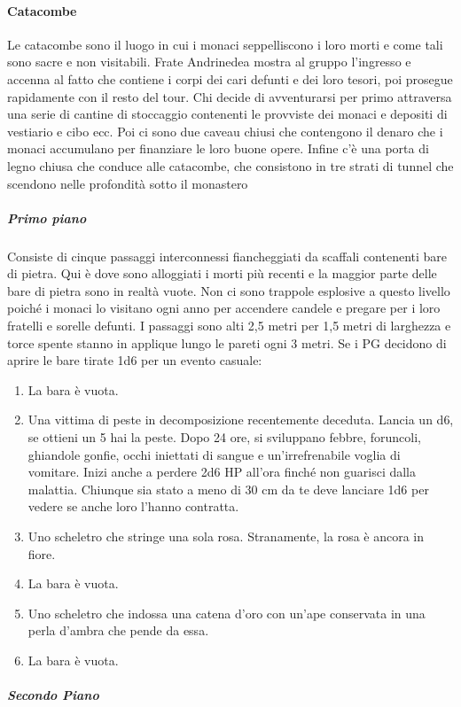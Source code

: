 \documentclass{article}
\begin{document}
    \paragraph{Catacombe}
    Le catacombe sono il luogo in cui i monaci seppelliscono i loro morti e come tali sono sacre e non visitabili. Frate Andrinedea mostra al gruppo l'ingresso e accenna al fatto che contiene i corpi dei cari defunti e dei loro tesori, poi prosegue rapidamente con il resto del tour.
Chi decide di avventurarsi per primo attraversa una serie di cantine di stoccaggio contenenti le provviste dei monaci e depositi di vestiario e cibo ecc.
Poi ci sono due caveau chiusi che contengono il denaro che i monaci accumulano per finanziare le loro buone opere.
Infine c'è una porta di legno chiusa che conduce alle catacombe, che consistono in tre strati di tunnel che scendono nelle profondità sotto il monastero
    \subparagraph{Primo piano}
    Consiste di cinque passaggi interconnessi fiancheggiati da scaffali contenenti bare di pietra. Qui è dove sono alloggiati i morti più recenti e la maggior parte delle bare di pietra sono in realtà vuote. Non ci sono trappole esplosive a questo livello poiché i monaci lo visitano ogni anno per accendere candele e pregare per i loro fratelli e sorelle defunti. I passaggi sono alti 2,5 metri per 1,5 metri di larghezza e torce spente stanno in applique lungo le pareti ogni 3 metri.
    Se i PG decidono di aprire le bare tirate 1d6 per un evento casuale:
    \begin{enumerate}
        \item La bara è vuota.
        \item Una vittima di peste in decomposizione recentemente deceduta. Lancia un d6, se ottieni un 5 hai la peste. Dopo 24 ore, si sviluppano febbre, foruncoli, ghiandole gonfie, occhi iniettati di sangue e un'irrefrenabile voglia di vomitare. Inizi anche a perdere 2d6 HP all'ora finché non guarisci dalla malattia. Chiunque sia stato a meno di 30 cm da te deve lanciare 1d6 per vedere se anche loro l'hanno contratta.
        \item Uno scheletro che stringe una sola rosa. Stranamente, la rosa è ancora in fiore.
        \item La bara è vuota.
        \item Uno scheletro che indossa una catena d'oro con un'ape conservata in una perla d'ambra che pende da essa.
        \item La bara è vuota.
    \end{enumerate}
    \subparagraph{Secondo Piano}
\end{document}
